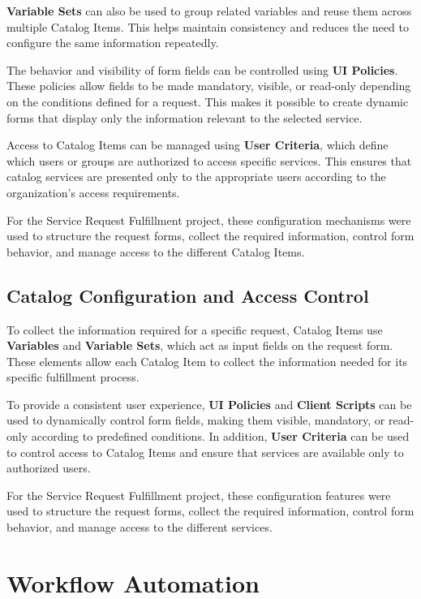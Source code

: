 \documentclass[12pt,a4paper]{report}
\begin{document}
\textbf{Variable Sets} can also be used to group related variables and reuse
them across multiple Catalog Items. This helps maintain consistency and
reduces the need to configure the same information repeatedly.

The behavior and visibility of form fields can be controlled using
\textbf{UI Policies}. These policies allow fields to be made mandatory,
visible, or read-only depending on the conditions defined for a request.
This makes it possible to create dynamic forms that display only the
information relevant to the selected service.

Access to Catalog Items can be managed using \textbf{User Criteria}, which
define which users or groups are authorized to access specific services.
This ensures that catalog services are presented only to the appropriate
users according to the organization's access requirements.

For the Service Request Fulfillment project, these configuration mechanisms
were used to structure the request forms, collect the required information,
control form behavior, and manage access to the different Catalog Items.

\subsection{Catalog Configuration and Access Control}

To collect the information required for a specific request, Catalog Items use
\textbf{Variables} and \textbf{Variable Sets}, which act as input fields on
the request form. These elements allow each Catalog Item to collect the
information needed for its specific fulfillment process.

To provide a consistent user experience, \textbf{UI Policies} and
\textbf{Client Scripts} can be used to dynamically control form fields,
making them visible, mandatory, or read-only according to predefined
conditions. In addition, \textbf{User Criteria} can be used to control access
to Catalog Items and ensure that services are available only to authorized
users.

For the Service Request Fulfillment project, these configuration features
were used to structure the request forms, collect the required information,
control form behavior, and manage access to the different services.


\section{Workflow Automation}
\end{document}

